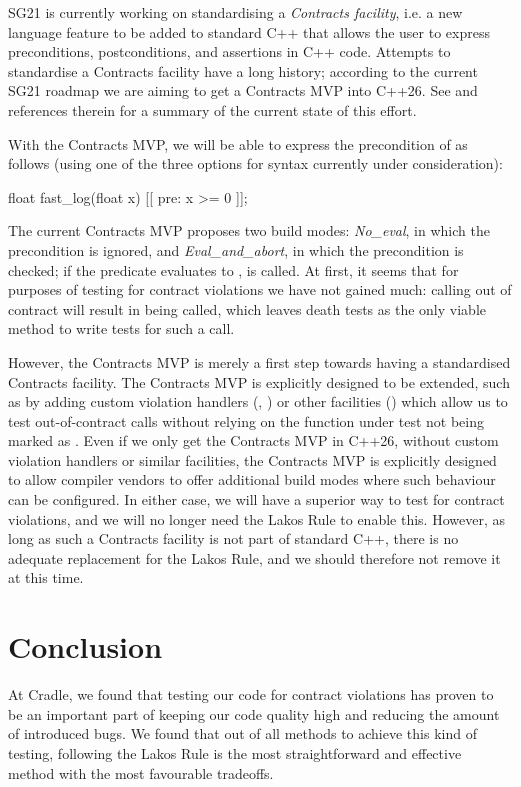 SG21 is currently working on standardising a \emph{Contracts facility}, i.e. a new language feature to be added to standard C++ that allows the user to express preconditions, postconditions, and assertions in C++ code. Attempts to standardise a Contracts facility have a long history; according to the current SG21 roadmap \cite{P2695R1} we are aiming to get a Contracts MVP into C++26. See \cite{P2521R3} and references therein for a summary of the current state of this effort.

With the Contracts MVP, we will be able to express the precondition of  as follows (using one of the three options for syntax currently under consideration):
\begin{codeblock}
float fast_log(float x) [[ pre: x >= 0 ]];
\end{codeblock}

The current Contracts MVP proposes two build modes: \emph{No_eval}, in which the precondition is ignored, and \emph{Eval_and_abort}, in which the precondition is checked; if the predicate evaluates to ,  is called. At first, it seems that for purposes of testing for contract violations we have not gained much: calling  out of contract will result in  being called, which leaves death tests as the only viable method to write tests for such a call.

However, the Contracts MVP is merely a first step towards having a standardised Contracts facility. The Contracts MVP is explicitly designed to be extended, such as by adding custom violation handlers (\cite{P2698R0}, \cite{P2811R0}) or other facilities (\cite{P2784R0}) which allow us to test out-of-contract calls without relying on the function under test not being marked as . Even if we only get the Contracts MVP in C++26, without custom violation handlers or similar facilities, the Contracts MVP is explicitly designed to allow compiler vendors to offer additional build modes where such behaviour can be configured. In either case, we will have a superior way to test for contract violations, and we will no longer need the Lakos Rule to enable this. However, as long as such a Contracts facility is not part of standard C++, there is no adequate replacement for the Lakos Rule, and we should therefore not remove it at this time.

\section{Conclusion}
At Cradle, we found that testing our code for contract violations has proven to be an important part of keeping our code quality high and reducing the amount of introduced bugs. We found that out of all methods to achieve this kind of testing, following the Lakos Rule is the most straightforward and effective method with the most favourable tradeoffs. 

